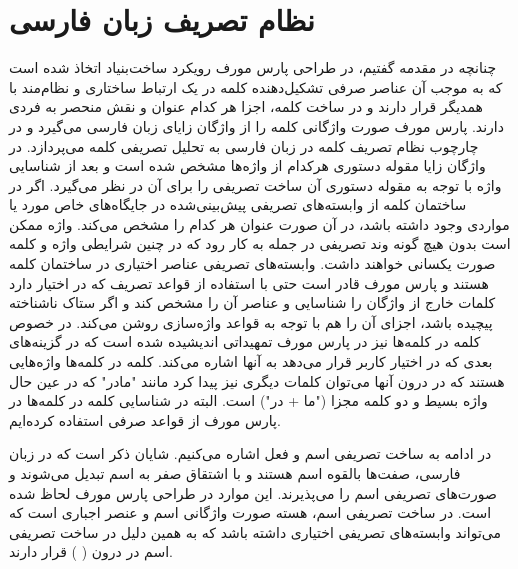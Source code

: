 \documentclass[12pt,onecolumn,a4paper]{article}
\begin{document}
    \section{نظام تصریف زبان فارسی}
    چنانچه در مقدمه گفتیم، در طراحی پارس مورف رویکرد ساخت‌بنیاد اتخاذ شده است که به موجب آن عناصر صرفی تشکیل‌دهنده کلمه در یک ارتباط ساختاری و نظام‌مند با همدیگر قرار دارند و در ساخت کلمه، اجزا هر کدام عنوان و نقش منحصر به فردی دارند. پارس مورف صورت واژگانی کلمه را از واژگان زایای زبان فارسی {\mfo\citep{Eslami83}} می‌گیرد و در چارچوب نظام تصریف کلمه در زبان فارسی {\mfo\citep{Eslami88}} به تحلیل تصریفی کلمه می‌پردازد. در واژگان زایا مقوله دستوری هرکدام از واژه‌ها مشخص شده است و بعد از شناسایی واژه با توجه به مقوله دستوری آن ساخت تصریفی را برای آن در نظر می‌گیرد. اگر در ساختمان کلمه از وابسته‌های تصریفی پیش‌بینی‌شده در جایگاه‌های خاص مورد یا مواردی وجود داشته باشد، در آن صورت عنوان هر کدام را مشخص می‌کند. واژه ممکن است بدون هیچ گونه وند تصریفی در جمله به کار رود که در چنین شرایطی واژه و کلمه صورت یکسانی خواهند داشت. وابسته‌های تصریفی عناصر اختیاری در ساختمان کلمه هستند و پارس مورف قادر است حتی با استفاده از قواعد تصریف که در اختیار دارد کلمات خارج از واژگان را شناسایی و عناصر آن را مشخص کند و اگر ستاک ناشناخته پیچیده باشد، اجزای آن را هم با توجه به قواعد واژه‌سازی روشن می‌کند. در خصوص کلمه در کلمه‌ها  نیز در پارس مورف تمهیداتی اندیشیده شده است که در گزینه‌های بعدی که در اختیار کاربر قرار می‌دهد به آنها اشاره می‌کند. کلمه در کلمه‌ها واژه‌هایی هستند که در درون آنها می‌توان کلمات دیگری نیز پیدا کرد مانند "مادر" که در عین حال واژه بسیط و دو کلمه مجزا ("ما + در") است. البته در شناسایی کلمه در کلمه‌ها در پارس مورف از قواعد صرفی استفاده کرده‌ایم.
    \par\noindent
    در ادامه به ساخت تصریفی اسم و فعل اشاره می‌کنیم. شایان ذکر است که در زبان فارسی، صفت‌ها بالقوه اسم هستند و با اشتقاق صفر به اسم تبدیل می‌شوند و صورت‌های تصریفی اسم را می‌پذیرند. این موارد در طراحی پارس مورف لحاظ شده است. در ساخت تصریفی اسم، هسته صورت واژگانی اسم و عنصر اجباری است که می‌تواند وابسته‌های تصریفی اختیاری داشته باشد که به همین دلیل در ساخت تصریفی اسم در درون ( ) قرار دارند.
\end{document}
